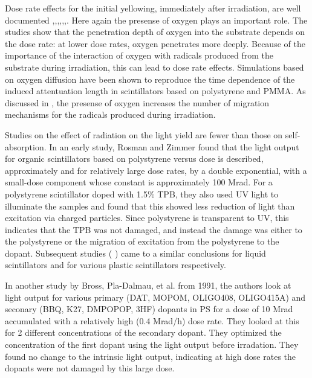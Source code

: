 \documentclass[review]{elsarticle}
\begin{document}
Dose rate effects for the initial yellowing, immediately after irradiation, are well documented  \cite{sauli},\cite{34504},\cite{Wick1991472},\cite{289295},\cite{173180},\cite{173178},\cite{Giokaris1993315}.  
Here again the presense of oxygen plays an important role.  The studies show that the penetration depth of oxygen into the substrate
depends on the dose rate: at lower dose rates, oxygen penetrates
more deeply.  Because of the importance of the interaction
of oxygen with radicals produced from the substrate during irradiation, this can lead to dose rate effects.
Simulations based on oxygen diffusion have been shown
to reproduce the time dependence of the induced attentuation length in scintillators based on polystyrene and PMMA\cite{Wick1991472}.  
As discussed 
in \cite{Wulkop1995141}, the presense of oxygen
increases the number of migration mechanisms for the radicals produced during irradiation.  


Studies on the effect of radiation on the light yield are fewer
than those on self-absorption.  
In an early study, Rosman and Zimmer\cite{rosmanzimmer} found that the light
output for organic scintillators based on polystyrene versus dose is described,
approximately and for relatively large dose rates, by a double exponential, 
with a small-dose component whose constant is approximately 100 Mrad.
For a polystyrene scintillator doped with 1.5\% TPB, they also used UV light to illuminate
the samples  and found that this showed less
reduction of light than excitation via charged particles.
Since polystyrene is transparent to UV, this
indicates that the TPB was not damaged, and instead the damage
was either to the polystyrene or the migration of excitation from the polystyrene
to the dopant.  Subsequent studies (\cite{berlman} \cite{173178}) came to a similar conclusions for
liquid scintillators and for various plastic scintillators respectively. 


In another study by Bross, Pla-Dalmau, et al. from 1991\cite{Bross199135}, the authors look at light output for various 
primary (DAT, MOPOM, OLIGO408, OLIGO415A) and 
seconary (BBQ, K27, DMPOPOP, 3HF) dopants 
in PS
for a dose of 10 Mrad accumulated with a relatively high (0.4 Mrad/h) dose rate.  They looked at this for 2 different concentrations of the secondary dopant.  They optimized the concentration of the first dopant using the light output before irradation.  They found no change to the intrinsic light output, indicating at high dose rates the dopants were
not damaged by this large dose.  
\end{document}
